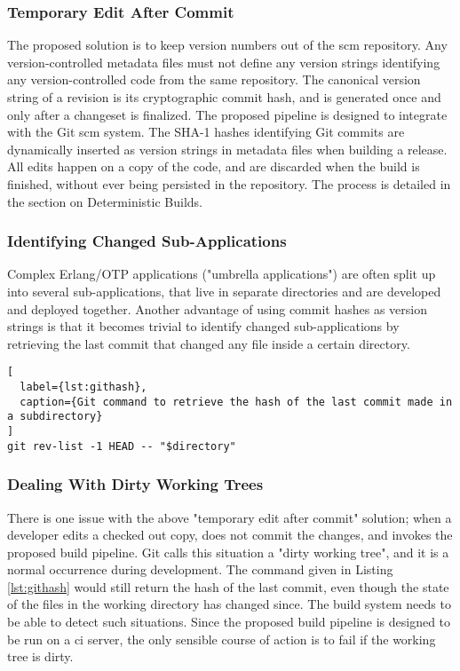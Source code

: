 \subsubsection{Temporary Edit After Commit}
The proposed solution is to keep version numbers out of the \acrfull{scm} repository. Any version-controlled metadata files must not define any version strings identifying any version-controlled code from the same repository. The canonical version string of a revision is its cryptographic commit hash, and is generated once and only after a changeset is finalized. The proposed pipeline is designed to integrate with the Git \acrshort{scm} system. The SHA-1 hashes identifying Git commits are dynamically inserted as version strings in metadata files when building a release. All edits happen on a copy of the code, and are discarded when the build is finished, without ever being persisted in the repository. The process is detailed in the section on Deterministic Builds.

\subsubsection{Identifying Changed Sub-Applications}
Complex Erlang/OTP applications ("umbrella applications") are often split up into several sub-applications, that live in separate directories and are developed and deployed together. Another advantage of using commit hashes as version strings is that it becomes trivial to identify changed sub-applications by retrieving the last commit that changed any file inside a certain directory.

\begin{lstlisting}[
  label={lst:githash},
  caption={Git command to retrieve the hash of the last commit made in a subdirectory}
]
git rev-list -1 HEAD -- "$directory"
\end{lstlisting}


\subsubsection{Dealing With Dirty Working Trees}
There is one issue with the above "temporary edit after commit" solution; when a developer edits a checked out copy, does not commit the changes, and invokes the proposed build pipeline. Git calls this situation a "dirty working tree", and it is a normal occurrence during development. The command given in Listing \ref{lst:githash} would still return the hash of the last commit, even though the state of the files in the working directory has changed since. The build system needs to be able to detect such situations. Since the proposed build pipeline is designed to be run on a \acrshort{ci} server, the only sensible course of action is to fail if the working tree is dirty.

